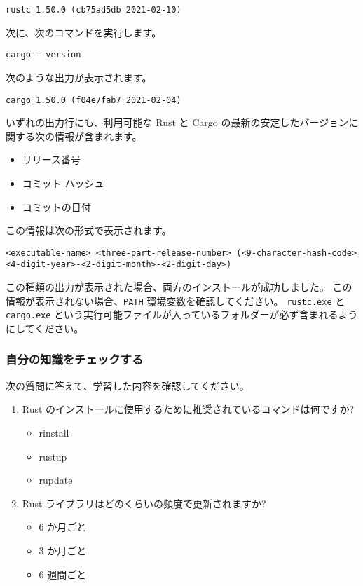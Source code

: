 \begin{lstlisting}[numbers=none]
rustc 1.50.0 (cb75ad5db 2021-02-10)
\end{lstlisting}

次に、次のコマンドを実行します。

\begin{lstlisting}[numbers=none]
cargo --version
\end{lstlisting}

次のような出力が表示されます。

\begin{lstlisting}[numbers=none]
cargo 1.50.0 (f04e7fab7 2021-02-04)
\end{lstlisting}

いずれの出力行にも、利用可能な Rust と Cargo の最新の安定したバージョンに関する次の情報が含まれます。

\begin{itemize}
\item リリース番号
\item コミット ハッシュ
\item コミットの日付
\end{itemize}

この情報は次の形式で表示されます。

\texttt{<executable-name> <three-part-release-number> (<9-character-hash-code>\\ <4-digit-year>-<2-digit-month>-<2-digit-day>)}

この種類の出力が表示された場合、両方のインストールが成功しました。 この情報が表示されない場合、\texttt{PATH} 環境変数を確認してください。 \texttt{rustc.exe} と \texttt{cargo.exe} という実行可能ファイルが入っているフォルダーが必ず含まれるようにしてください。

\subsubsection{自分の知識をチェックする}

次の質問に答えて、学習した内容を確認してください。

\begin{enumerate}
\item Rust のインストールに使用するために推奨されているコマンドは何ですか?

\begin{itemize}
\item rinstall
\item rustup
\item rupdate
\end{itemize}

\item Rust ライブラリはどのくらいの頻度で更新されますか?
\begin{itemize}
\item 6 か月ごと
\item 3 か月ごと
\item 6 週間ごと
\end{itemize}
\end{enumerate}


